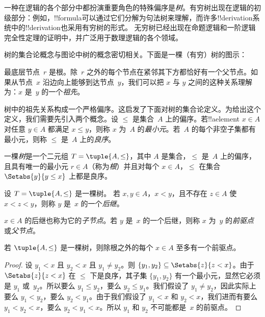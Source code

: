 \documentclass[../../../include/open-logic-section]{subfiles}
\begin{document}

一种在逻辑的各个部分中都扮演重要角色的特殊偏序是\emph{树}。有穷树出现在逻辑的初级部分：例如，!!{formula}可以通过它们分解为句法树来理解，而许多!!{derivation}系统中的!!{derivation}也采用有穷树的形式。
%
无穷树已经出现在命题逻辑和一阶逻辑完全性定理的证明中，并广泛用于数理逻辑的各个领域。

树的集合论概念与图论中树的概念密切相关。下面是一棵（有穷）树的图示：

\begin{center}
\end{center}

最底层节点~$r$ 是根。除~$r$ 之外的每个节点在紧邻其下方都恰好有一个父节点。如果从节点~$x$ 沿边向上能够到达节点~$y$，我们可以把 $x$ 与 $y$ 之间的这种关系理解为：$x$ 是~$y$ 的一个\emph{祖先}。

树中的祖先关系构成一个严格偏序。这启发了下面对树的集合论定义。为给出这个定义，我们需要先引入两个概念。设 $\le$ 是集合~$A$ 上的偏序。若!!a{element} $x \in A$ 对任意 $y \in A$ 都满足 $x \le y$，则称 $x$ 为~$A$ 的\emph{最小元}。若~$A$ 的每个非空子集都有最小元，则称 $\le$ 是~$A$ 上的\emph{良序}。

\begin{defn}[树]
一棵\emph{树}是一个二元组 $T = \tuple{A, \le}$，其中 $A$ 是集合，$\le$ 是~$A$ 上的偏序，且具有唯一的最小元 $r \in A$（称为\emph{根}）并且对每个 $x \in A$，$\le$ 在集合 $\Setabs{y}{y \le x}$ 上都是良序。
\end{defn}

\begin{defn}[后继点]
设 $T = \tuple{A, \le}$ 是一棵树。
若 $x,y \in A$，$x < y$，且不存在 $z \in A$ 使 $x < z < y$，则称 $y$ 是~$x$ 的一个\emph{后继}。
\end{defn}

$x \in A$ 的后继也称为它的\emph{子节点}。若 $y$ 是~$x$ 的一个后继，则称 $x$ 为~$y$ 的\emph{前驱点}或\emph{父节点}。

\begin{prop}
若 $\tuple{A,\le}$ 是一棵树，则除根之外的每个 $x \in A$ 至多有一个前驱点。
\end{prop}

\begin{proof}
  设 $y_1 < x$ 且 $y_2 < x$ 且 $y_1 \neq y_2$。则 $\{y_1,
  y_2\} \subseteq \Setabs{z}{z<x}$。由于 $\Setabs{z}{z<x}$ 在 $\le$ 下是良序，其子集 $\{y_1, y_2\}$ 有一个最小元，显然它必须是 $y_1$ 或~$y_2$。所以要么 $y_1 \le y_2$，要么 $y_2 \le y_1$。我们假设了 $y_1 \neq y_2$，因此实际上要么 $y_1 < y_2$，要么 $y_2 < y_1$。由于我们假设了 $y_1 < x$ 和 $y_2 < x$，我们进而有要么 $y_1 < y_2
  < x$，要么 $y_2 < y_1 < x$。所以 $y_1$ 和 $y_2$ 不可能都是~$x$ 的前驱点。
\end{proof}
\end{document}
